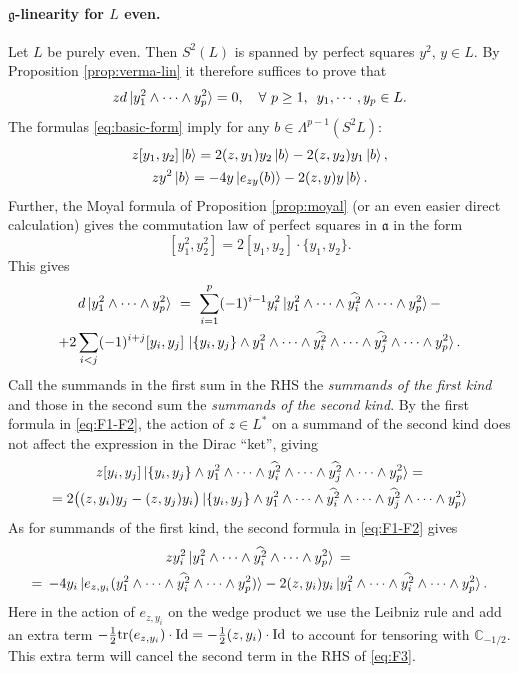\documentclass[12pt, reqno]{article}
\def\CC{\mathbb{C}}
\def\aen{\mathfrak{a}}
\def\gen{\mathfrak{g}}
\def\be{\begin{equation}}
\def\ee{\end{equation}}
\def\Id{\operatorname{Id}\nolimits}
\def\on{\operatorname}
\def\tr{{\on{tr}}}
\def\wh{ \widehat}
\def\be{\begin{equation}}
\def\ee{\end{equation}}
\theoremstyle{definition}
\theoremstyle{remark}
\numberwithin{itemcounter}{section}
\numberwithin{equation}{section}
\begin{document}
 \paragraph{$\gen$-linearity for $L$ even.}
  Let $L$ be purely even. Then $S^2(L)$ is spanned by perfect squares $y^2$,
  $y\in L$.  By Proposition \ref {prop:verma-lin} it therefore suffices to prove that
  \[
  z d\ket{ y_1^2\wedge\cdots \wedge y_p^2} = 0, \quad \forall \,\,p\geq 1, \,\,\,  y_1,\cdots, y_p\in L. 
  \]
 The formulas \eqref{eq:basic-form} imply for any $b\in \Lambda^{p-1}(S^2L)$:
 \be\label{eq:F1-F2}
 \begin{gathered}
 z[y_1, y_2] \ket{b}  =  2 (z,y_1) y_2\ket{b} -2  (z,y_2) y_1\ket{b},
 \\
 zy^2\ket{b} = -4y \ket{e_{zy}(b)} -2 (z,y) y\ket{b}. 
 \end{gathered}
 \ee
 Further, the Moyal formula of Proposition \ref{prop:moyal} (or an even easier direct
 calculation) gives the commutation law of perfect squares in $\aen$ in the form
 \[
 [y_1^2, y_2^2] = 2 [y_1, y_2] \cdot \{y_1, y_2\}. 
 \]
 This gives
 \be\label{eq:d(a)bef-z}
 \begin{gathered}
 d\ket{y_1^2\wedge \cdots \wedge y_p^2} \,\,  = \,\, \sum_{i=1}^p (-1)^{i-1} y_i^2
 \ket{y_1^2 \wedge\cdots \wedge \wh {y_i^2}\wedge\cdots \wedge y_p^2} -
 \\
 + 2 \sum_{i<j} (-1)^{i+j} [y_i, y_j] \,
 \ket{ \{y_i, y_j\} \wedge y_1^2 \wedge\cdots\wedge \wh {y_i^2} \wedge\cdots\wedge
 \wh {y_j^2}
 \wedge\cdots\wedge y_p^2}.
 \end{gathered}
  \ee
 Call the summands in the first sum in the RHS the {\em summands of the first kind}
 and those in the second sum the {\em summands of the second kind}. 
 By the first formula in \eqref {eq:F1-F2}, the action of $z\in L^*$ on a summand
 of the second kind does not affect the expression in the Dirac ``ket'', giving
 \be\label{eq:z-second}
 \begin{gathered}
 z[y_i, y_j] \ket{ \{y_i, y_j\} \wedge y_1^2 \wedge\cdots\wedge \wh{ y_i^2}
  \wedge\cdots\wedge \wh{y_j^2}
 \wedge\cdots\wedge y_p^2} = 
 \\
 =2 \bigl((z,y_i) y_j  - (z,y_j) y_i\bigr)\ket{ \{y_i, y_j\} \wedge y_1^2 \wedge\cdots\wedge\wh{ y_i^2}
  \wedge\cdots\wedge \wh{y_j^2}
 \wedge\cdots\wedge y_p^2} 
 \end{gathered} 
 \ee
 As for summands of the first kind,  the second formula in  \eqref {eq:F1-F2}
 gives
 \be\label{eq:F3}
 \begin{gathered}
 z y_i^2  \ket{y_1^2 \wedge\cdots \wedge \wh {y_i^2}\wedge\cdots \wedge y_p^2}\,=\,
 \\
 = \, -4 y_i \ket {e_{z,y_i}(y_1^2 \wedge\cdots\wedge \wh {y_i^2} \wedge\cdots\wedge
 y_p^2)}  -2  (z,y_i) y_i  
 \ket{y_1^2 \wedge\cdots \wedge \wh {y_i^2}\wedge\cdots \wedge y_p^2}.
 \end{gathered}
 \ee
 Here in the action of $e_{z,y_i}$ on the wedge product we use the Leibniz rule and add
 an extra term $-{1\over 2} \tr (e_{z,y_i})\cdot\Id  = - {1\over 2} (z,y_i)\cdot \Id$
 to account for tensoring with $\CC_{-1/2}$.
 This extra term will cancel the second term in the RHS of \eqref{eq:F3}. 
 
\end{document}
